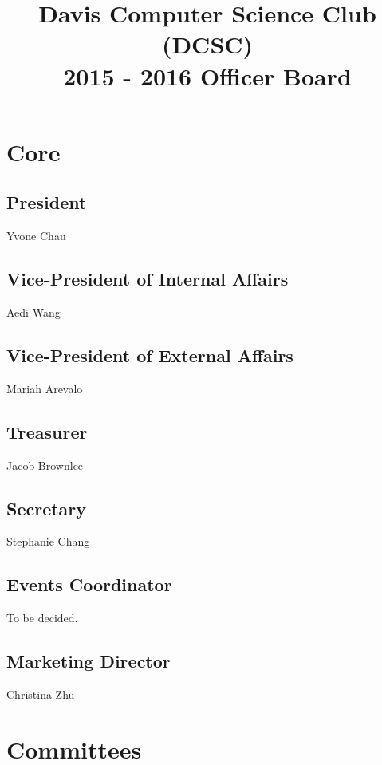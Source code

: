 \documentclass[10pt]{article}
\title{Davis Computer Science Club (DCSC)\\2015 - 2016 Officer Board}
\date{}
\author{}
\begin{document}
\maketitle

\section{Core}

\subsection{President}

Yvone Chau

\subsection{Vice-President of Internal Affairs}

Aedi Wang

\subsection{Vice-President of External Affairs}

Mariah Arevalo

\subsection{Treasurer}

Jacob Brownlee

\subsection{Secretary}

Stephanie Chang

\subsection{Events Coordinator}

To be decided.

\subsection{Marketing Director}

Christina Zhu

\section{Committees}
\end{document}
